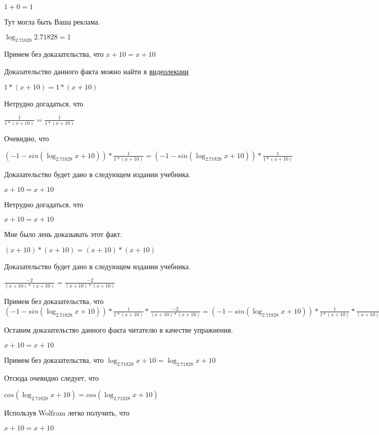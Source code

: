 \documentclass[12pt,a4paper,fleqn]{article}
\theoremstyle{definition}
\begin{document}
$ 1  +  0  =  1 $

Тут могла быть Ваша реклама.

$\log_{ 2.71828 }{ 2.71828 } =  1 $

Примем без доказательства, что
$ x  +  10  =  x  +  10 $

Доказательство данного факта можно найти в \href{https://www.youtube.com/watch?v=dQw4w9WgXcQ}{видеолекции}

$ 1  * ( x  +  10 ) =  1  * ( x  +  10 )$

Нетрудно догадаться, что

$\frac{ 1 }{ 1  * ( x  +  10 )}
 = \frac{ 1 }{ 1  * ( x  +  10 )}
$

Очевидно, что

$( -1  - sin(\log_{ 2.71828 }{ x  +  10 })) * \frac{ 1 }{ 1  * ( x  +  10 )}
 = ( -1  - sin(\log_{ 2.71828 }{ x  +  10 })) * \frac{ 1 }{ 1  * ( x  +  10 )}
$

Доказательство будет дано в следующем издании учебника.

$ x  +  10  =  x  +  10 $

Нетрудно догадаться, что

$ x  +  10  =  x  +  10 $

Мне было лень доказывать этот факт.

$( x  +  10 ) * ( x  +  10 ) = ( x  +  10 ) * ( x  +  10 )$

Доказательство будет дано в следующем издании учебника.

$\frac{ -2 }{( x  +  10 ) * ( x  +  10 )}
 = \frac{ -2 }{( x  +  10 ) * ( x  +  10 )}
$

Примем без доказательства, что
$( -1  - sin(\log_{ 2.71828 }{ x  +  10 })) * \frac{ 1 }{ 1  * ( x  +  10 )}
 * \frac{ -2 }{( x  +  10 ) * ( x  +  10 )}
 = ( -1  - sin(\log_{ 2.71828 }{ x  +  10 })) * \frac{ 1 }{ 1  * ( x  +  10 )}
 * \frac{ -2 }{( x  +  10 ) * ( x  +  10 )}
$

Оставим доказательство данного факта читателю в качестве упражнения.

$ x  +  10  =  x  +  10 $

Примем без доказательства, что
$\log_{ 2.71828 }{ x  +  10 } = \log_{ 2.71828 }{ x  +  10 }$

Отсюда очевидно следует, что

$cos(\log_{ 2.71828 }{ x  +  10 }) = cos(\log_{ 2.71828 }{ x  +  10 })$

Используя Wolfram легко получить, что

$ x  +  10  =  x  +  10 $
\end{document}
